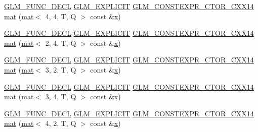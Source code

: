 \begin{DoxyCompactItemize}
\item 
\hyperlink{setup_8hpp_ab2d052de21a70539923e9bcbf6e83a51}{G\+L\+M\+\_\+\+F\+U\+N\+C\+\_\+\+D\+E\+CL} \hyperlink{setup_8hpp_a6c74f5a5e7b134ab69023ff9a30d4d5d}{G\+L\+M\+\_\+\+E\+X\+P\+L\+I\+C\+IT} \hyperlink{setup_8hpp_a0900f9145e68bf6061b6f5e7be3fa751}{G\+L\+M\+\_\+\+C\+O\+N\+S\+T\+E\+X\+P\+R\+\_\+\+C\+T\+O\+R\+\_\+\+C\+X\+X14} \hyperlink{structglm_1_1mat_3_012_00_013_00_01_t_00_01_q_01_4_a2f6d96ad0ac82fa147ef219e2be3ff36}{mat} (\hyperlink{structglm_1_1mat}{mat}$<$ 4, 4, T, Q $>$ const \&\hyperlink{_s_d_l__opengl_8h_ad0e63d0edcdbd3d79554076bf309fd47}{x})
\item 
\hyperlink{setup_8hpp_ab2d052de21a70539923e9bcbf6e83a51}{G\+L\+M\+\_\+\+F\+U\+N\+C\+\_\+\+D\+E\+CL} \hyperlink{setup_8hpp_a6c74f5a5e7b134ab69023ff9a30d4d5d}{G\+L\+M\+\_\+\+E\+X\+P\+L\+I\+C\+IT} \hyperlink{setup_8hpp_a0900f9145e68bf6061b6f5e7be3fa751}{G\+L\+M\+\_\+\+C\+O\+N\+S\+T\+E\+X\+P\+R\+\_\+\+C\+T\+O\+R\+\_\+\+C\+X\+X14} \hyperlink{structglm_1_1mat_3_012_00_013_00_01_t_00_01_q_01_4_aa8c0f741a843edc6dc56b7b87e33c080}{mat} (\hyperlink{structglm_1_1mat}{mat}$<$ 2, 4, T, Q $>$ const \&\hyperlink{_s_d_l__opengl_8h_ad0e63d0edcdbd3d79554076bf309fd47}{x})
\item 
\hyperlink{setup_8hpp_ab2d052de21a70539923e9bcbf6e83a51}{G\+L\+M\+\_\+\+F\+U\+N\+C\+\_\+\+D\+E\+CL} \hyperlink{setup_8hpp_a6c74f5a5e7b134ab69023ff9a30d4d5d}{G\+L\+M\+\_\+\+E\+X\+P\+L\+I\+C\+IT} \hyperlink{setup_8hpp_a0900f9145e68bf6061b6f5e7be3fa751}{G\+L\+M\+\_\+\+C\+O\+N\+S\+T\+E\+X\+P\+R\+\_\+\+C\+T\+O\+R\+\_\+\+C\+X\+X14} \hyperlink{structglm_1_1mat_3_012_00_013_00_01_t_00_01_q_01_4_aac92363f835df089a372ddedce1560e0}{mat} (\hyperlink{structglm_1_1mat}{mat}$<$ 3, 2, T, Q $>$ const \&\hyperlink{_s_d_l__opengl_8h_ad0e63d0edcdbd3d79554076bf309fd47}{x})
\item 
\hyperlink{setup_8hpp_ab2d052de21a70539923e9bcbf6e83a51}{G\+L\+M\+\_\+\+F\+U\+N\+C\+\_\+\+D\+E\+CL} \hyperlink{setup_8hpp_a6c74f5a5e7b134ab69023ff9a30d4d5d}{G\+L\+M\+\_\+\+E\+X\+P\+L\+I\+C\+IT} \hyperlink{setup_8hpp_a0900f9145e68bf6061b6f5e7be3fa751}{G\+L\+M\+\_\+\+C\+O\+N\+S\+T\+E\+X\+P\+R\+\_\+\+C\+T\+O\+R\+\_\+\+C\+X\+X14} \hyperlink{structglm_1_1mat_3_012_00_013_00_01_t_00_01_q_01_4_ab7569f3cc2b0d096111ca1a30a619e13}{mat} (\hyperlink{structglm_1_1mat}{mat}$<$ 3, 4, T, Q $>$ const \&\hyperlink{_s_d_l__opengl_8h_ad0e63d0edcdbd3d79554076bf309fd47}{x})
\item 
\hyperlink{setup_8hpp_ab2d052de21a70539923e9bcbf6e83a51}{G\+L\+M\+\_\+\+F\+U\+N\+C\+\_\+\+D\+E\+CL} \hyperlink{setup_8hpp_a6c74f5a5e7b134ab69023ff9a30d4d5d}{G\+L\+M\+\_\+\+E\+X\+P\+L\+I\+C\+IT} \hyperlink{setup_8hpp_a0900f9145e68bf6061b6f5e7be3fa751}{G\+L\+M\+\_\+\+C\+O\+N\+S\+T\+E\+X\+P\+R\+\_\+\+C\+T\+O\+R\+\_\+\+C\+X\+X14} \hyperlink{structglm_1_1mat_3_012_00_013_00_01_t_00_01_q_01_4_a592126e55a54fa4c50fee4e2b8be2fa9}{mat} (\hyperlink{structglm_1_1mat}{mat}$<$ 4, 2, T, Q $>$ const \&\hyperlink{_s_d_l__opengl_8h_ad0e63d0edcdbd3d79554076bf309fd47}{x})

\end{DoxyCompactItemize}
